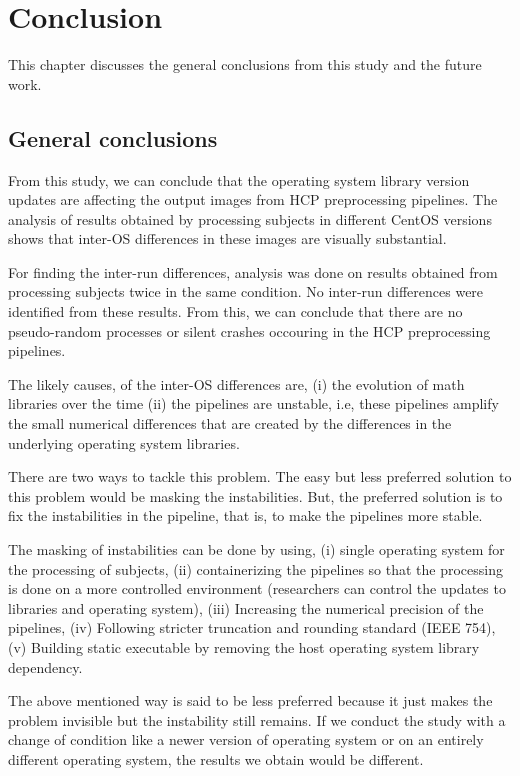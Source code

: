 \chapter{Conclusion}\label{conclusion}
This chapter discusses the general conclusions from this study and the future work.

\section{General conclusions}
From this study, we can conclude that the operating system library version updates are affecting the output images from HCP preprocessing pipelines. The analysis of results obtained by processing subjects in different CentOS versions shows that inter-OS differences in these images are visually substantial.

For finding the inter-run differences, analysis was done on results obtained from processing subjects twice in the same condition. No inter-run differences were identified from these results. From this, we can conclude that there are no pseudo-random processes or silent crashes occouring in the HCP preprocessing pipelines.

The likely causes, of the inter-OS differences are, (i) the evolution of math libraries over the time (ii) the pipelines are unstable, i.e, these pipelines amplify the small numerical differences that are created by the differences in the underlying operating system libraries.

There are two ways to tackle this problem. The easy but less preferred solution to this problem would be masking the instabilities. But, the preferred solution is to fix the instabilities in the pipeline, that is, to make the pipelines more stable.

The masking of instabilities can be done by using, (i) single operating system for the processing of subjects, (ii) containerizing the pipelines so that the processing is done on a more controlled environment (researchers can control the updates to libraries and operating system), (iii) Increasing the numerical precision of the pipelines, (iv) Following stricter truncation and rounding standard (IEEE 754), (v) Building static executable by removing the host operating system library dependency.

The above mentioned way is said to be less preferred because it just makes the problem invisible but the instability still remains. If we conduct the study with a change of condition like a newer version of operating system or on an entirely different operating system, the results we obtain would be different.

